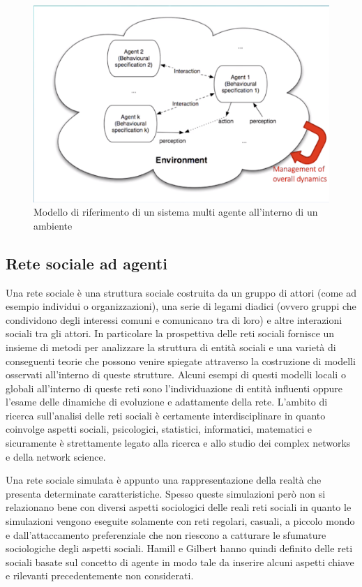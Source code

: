 \begin{figure}[H]
    \centering
    \includegraphics[width=.7\textwidth]{resources/agente_modello_riferimento.png}
    \caption{Modello di riferimento di un sistema multi agente all'interno di un ambiente} 
\end{figure}

\subsection{Rete sociale ad agenti}

Una rete sociale \cite{SocialNetworkAnalysis} è una struttura sociale costruita da un gruppo di attori (come ad esempio individui o organizzazioni), una serie di legami diadici (ovvero gruppi che condividono degli interessi comuni e comunicano tra di loro) e altre interazioni sociali tra gli attori. In particolare la prospettiva delle reti sociali fornisce un insieme di metodi per analizzare la struttura di entità sociali e una varietà di conseguenti teorie che possono venire spiegate attraverso la costruzione di modelli osservati all'interno di queste strutture.
Alcuni esempi di questi modelli locali o globali all'interno di queste reti sono l'individuazione di entità influenti oppure l'esame delle dinamiche di evoluzione e adattamente della rete.
L'ambito di ricerca sull'analisi delle reti sociali è certamente interdisciplinare in quanto coinvolge aspetti sociali, psicologici, statistici, informatici, matematici e sicuramente è strettamente legato alla ricerca e allo studio dei complex networks e della network science.

Una rete sociale simulata è appunto una rappresentazione della realtà che presenta determinate caratteristiche. Spesso queste simulazioni però non si relazionano bene con diversi aspetti sociologici delle reali reti sociali in quanto le simulazioni vengono eseguite solamente con reti regolari, casuali, a piccolo mondo e dall'attaccamento preferenziale che non riescono a catturare le sfumature sociologiche degli aspetti sociali. Hamill e Gilbert \cite{SimulatingLargeSocialNetworks} hanno quindi definito delle reti sociali basate sul concetto di agente in modo tale da inserire alcuni aspetti chiave e rilevanti precedentemente non considerati.

